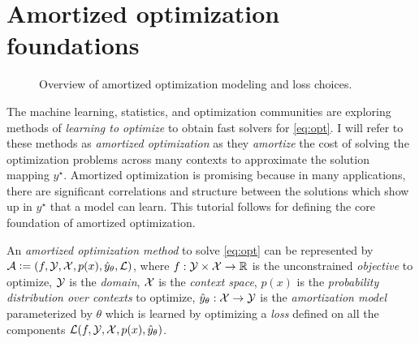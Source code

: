 \chapter{Amortized optimization foundations}
\label{sec:foundations}

\begin{figure}[ht!]
  \centering
  \label{fig:foundations}
  \caption{Overview of amortized optimization modeling and loss choices.}
\end{figure}


The machine learning, statistics, and optimization
communities are exploring methods of \emph{learning
to optimize} to obtain fast solvers for \cref{eq:opt}.
I will refer to these methods as \emph{amortized optimization}
as they \emph{amortize} the cost of solving the
optimization problems across many contexts to approximate
the solution mapping $y^\star$.
Amortized optimization is promising because in many applications,
there are significant correlations and structure between the
solutions which show up in $y^\star$ that a model can learn.
This tutorial follows \citet{shu2017amortized} for defining the core
foundation of amortized optimization.

\begin{definition}
  An \emph{amortized optimization method} to solve \cref{eq:opt}
  can be represented by
  ${\mathcal{A}}\vcentcolon= (f, {\mathcal{Y}}, {\mathcal{X}}, p(x), \hat y_\theta, {\mathcal{L}})$,
  where
  $f: {\mathcal{Y}}\times{\mathcal{X}} \rightarrow \mathbb{R}$ is the
  unconstrained \emph{objective} to optimize,
  ${\mathcal{Y}}$ is the \emph{domain},
  ${\mathcal{X}}$ is the \emph{context space},
  $p(x)$ is the \emph{probability distribution over contexts} to optimize,
  $\hat y_\theta: {\mathcal{X}}\rightarrow {\mathcal{Y}}$ is the \emph{amortization model}
  parameterized by $\theta$
  which is learned by optimizing a \emph{loss}
  defined on all the components
  ${\mathcal{L}}(f, {\mathcal{Y}}, {\mathcal{X}}, p(x), \hat y_\theta)$.
  \label{def:amor}
\end{definition}


